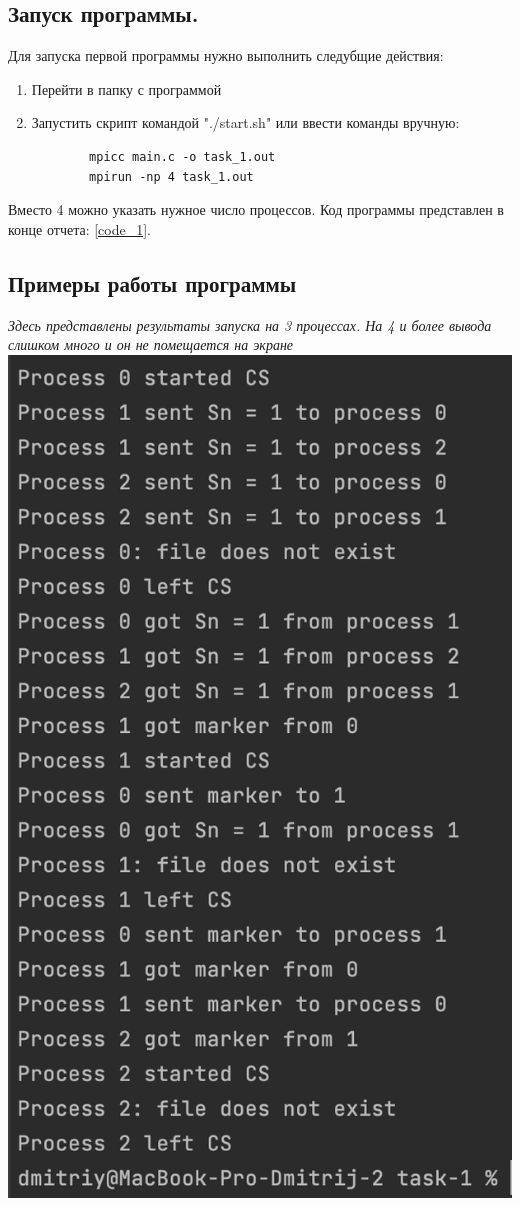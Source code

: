 \documentclass{article}
\begin{document}
\subsection{Запуск программы.}
Для запуска первой программы нужно выполнить следубщие действия:
\begin{enumerate}
    \item Перейти в папку с программой
    \item Запустить скрипт командой "./start.sh" или ввести команды вручную:
    \begin{lstlisting}
        mpicc main.c -o task_1.out
        mpirun -np 4 task_1.out
    \end{lstlisting}
\end{enumerate}
Вместо 4 можно указать нужное число процессов. Код программы представлен в конце отчета: \ref{code_1}.

\subsection{Примеры работы программы}
\textit{Здесь представлены результаты запуска на 3 процессах. На 4 и более вывода слишком много и он не помещается на экране}\\
\includegraphics[width=1\linewidth]{task_1_3.png}
\end{document}
